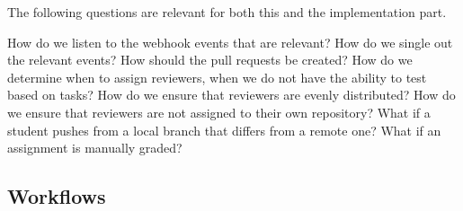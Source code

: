 The following questions are relevant for both this and the implementation part.

How do we listen to the webhook events that are relevant?
How do we single out the relevant events?
How should the pull requests be created?
How do we determine when to assign reviewers, when we do not have the ability to test based on tasks?
How do we ensure that reviewers are evenly distributed?
How do we ensure that reviewers are not assigned to their own repository?
What if a student pushes from a local branch that differs from a remote one?
What if an assignment is manually graded?


\subsection{Workflows}